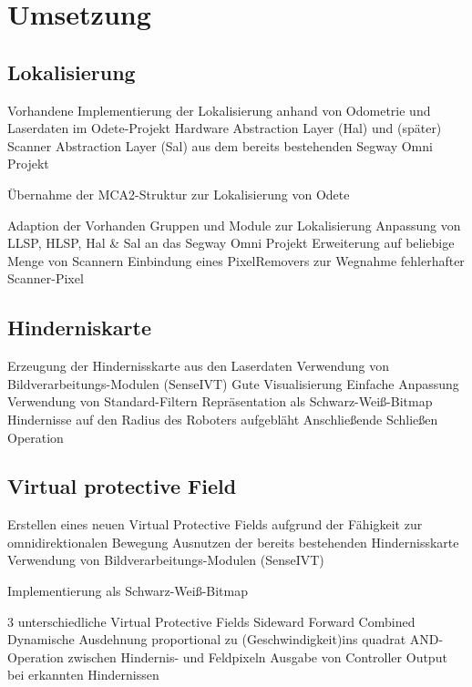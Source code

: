 \section{Umsetzung}
\label{lokalisierung_umsetzung_sec}
\authorsection{\editordummy}

\subsection{Lokalisierung}
 Vorhandene Implementierung der
Lokalisierung anhand von Odometrie und Laserdaten im Odete-Projekt
Hardware Abstraction Layer (Hal) und (später) Scanner Abstraction Layer (Sal)
aus dem bereits bestehenden Segway Omni Projekt

Übernahme der MCA2-Struktur zur Lokalisierung von Odete

Adaption der Vorhanden Gruppen und Module zur Lokalisierung 
Anpassung von LLSP, HLSP, Hal \& Sal an das Segway Omni Projekt
Erweiterung auf beliebige Menge von Scannern
Einbindung eines PixelRemovers zur Wegnahme fehlerhafter Scanner-Pixel

\subsection{Hinderniskarte}

Erzeugung der Hindernisskarte aus den Laserdaten
Verwendung von Bildverarbeitungs-Modulen (SenseIVT)
            Gute Visualisierung
            Einfache Anpassung
            Verwendung von Standard-Filtern
         Repräsentation als Schwarz-Weiß-Bitmap
        Hindernisse auf den Radius des Roboters aufgebläht
        Anschließende Schließen Operation
\subsection{Virtual protective Field}
    Erstellen eines neuen Virtual Protective Fields aufgrund der Fähigkeit zur omnidirektionalen Bewegung
        Ausnutzen der bereits bestehenden Hindernisskarte
            Verwendung von Bildverarbeitungs-Modulen (SenseIVT)

Implementierung als Schwarz-Weiß-Bitmap

        3 unterschiedliche Virtual Protective Fields
            Sideward
            Forward
            Combined
        Dynamische Ausdehnung proportional zu (Geschwindigkeit)ins quadrat
        AND-Operation zwischen Hindernis- und Feldpixeln
        Ausgabe von Controller Output bei erkannten Hindernissen
